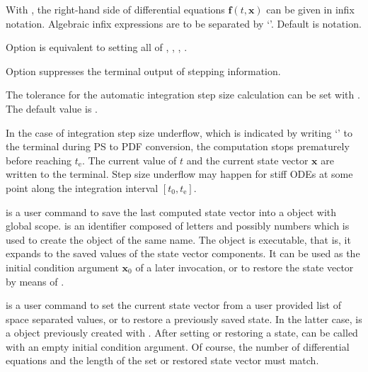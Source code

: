\documentclass[11pt,english,BCOR10mm,DIV12,bibliography=totoc,parskip=false,smallheadings
    headexclude,footexclude,oneside,dvips,UKenglish]{pst-doc}
\begin{document}
With , the right-hand side of differential equations $\mathbf{f}(t,\mathbf{x})$ can be given in infix notation. Algebraic infix expressions are to be separated by `\Lkeyword{|}'. Default is \PS{} notation.

Option  is equivalent to setting all of , , , .

Option  suppresses the terminal output of stepping information.

The tolerance for the automatic integration step size calculation can be set with  \Lkeyword{=}. The default value is .

In the case of integration step size underflow, which  is indicated by writing `\Lkeyword{!}' to the terminal during PS to PDF conversion, the computation stops prematurely before reaching $t_\mathrm{e}$. The current value of $t$ and the current state vector $\mathbf{x}$ are written to the terminal. Step size underflow may happen for stiff ODEs at some point along the integration interval $[t_0, t_\mathrm{e}]$.\\[1ex]

\begin{BDef}
\end{BDef}
is a user command to save the last computed state vector into a \PS{} object with global scope.  is an identifier composed of letters and possibly numbers which is used to create the \PS{} object of the same name. The object is executable, that is, it expands to the saved values of the state vector components. It can be used as the initial condition argument $\mathbf{x}_0$ of a later  invocation, or to restore the state vector by means of .\\[1ex] 

\begin{BDef}
\end{BDef}
is a user command to set the current state vector from a user provided list of space separated values, or to restore a previously saved state. In the latter case,  is a \PS{} object previously created with . After setting or restoring a state,  can be called with an empty initial condition argument. Of course, the number of differential equations and the length of the set or restored state vector must match.
\end{document}
